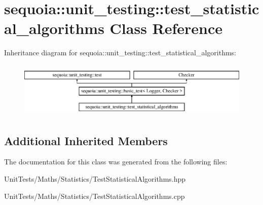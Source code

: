 \hypertarget{classsequoia_1_1unit__testing_1_1test__statistical__algorithms}{}\section{sequoia\+::unit\+\_\+testing\+::test\+\_\+statistical\+\_\+algorithms Class Reference}
\label{classsequoia_1_1unit__testing_1_1test__statistical__algorithms}
Inheritance diagram for sequoia\+::unit\+\_\+testing\+::test\+\_\+statistical\+\_\+algorithms\+:\begin{figure}[H]
\begin{center}
\leavevmode
\includegraphics[height=2.666667cm]{classsequoia_1_1unit__testing_1_1test__statistical__algorithms}
\end{center}
\end{figure}
\subsection*{Additional Inherited Members}


The documentation for this class was generated from the following files\+:\begin{DoxyCompactItemize}
\item 
Unit\+Tests/\+Maths/\+Statistics/Test\+Statistical\+Algorithms.\+hpp\item 
Unit\+Tests/\+Maths/\+Statistics/Test\+Statistical\+Algorithms.\+cpp\end{DoxyCompactItemize}
